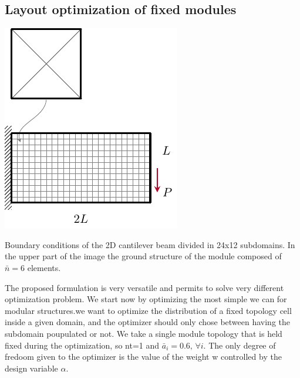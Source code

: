 \subsection{Layout optimization of fixed modules}
\begin{marginfigure}
    \centering
    \includegraphics[width=\linewidth]{figures/06_DMO/00_cantilever_bcs/cant_mesh.pdf}
    \caption{Boundary conditions of the 2D cantilever beam divided in 24x12 subdomains. In the upper part of the image the ground structure of the module composed of $\bar{n}=6$ elements.}
    \label{fig:06_cant_BC_GS}
\end{marginfigure}
The proposed formulation is very versatile and permits to solve very different optimization problem. We start now by optimizing the most simple we can for modular structures.we want to optimize the distribution of a fixed topology cell inside a given domain, and the optimizer should only chose between having the subdomain poupulated or not. We take a single module topology that is held fixed during the optimization, so nt=1 and $\bar{a}_i=0.6,\,\forall i$. The only degree of fredoom given to the optimizer is the value of the weight w controlled by the design variable $\alpha$.


